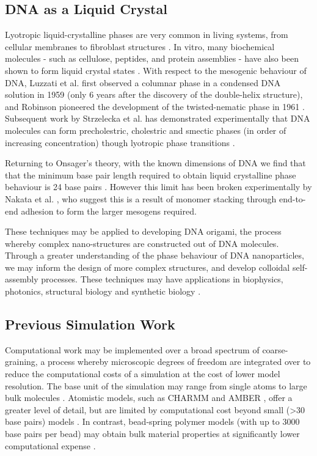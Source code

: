 \documentclass[11pt, a4paper]{article} %
\begin{document}
\subsection{DNA as a Liquid Crystal} 
Lyotropic liquid-crystalline phases are very common in living systems, from cellular membranes to fibroblast structures \cite{Stewart1966, Rey2013}. In vitro, many biochemical molecules - such as cellulose, peptides, and protein assemblies - have also been shown to form liquid crystal states \cite{Zhao2019}. With respect to the mesogenic behaviour of DNA, Luzzati et al. first observed a columnar phase in a condensed DNA solution in 1959 (only 6 years after the discovery of the double-helix structure), and Robinson pioneered the development of the twisted-nematic phase in 1961 \cite{Luzzati1959, Robinson1961}. Subsequent work by Strzelecka et al. has demonstrated experimentally that DNA molecules can form precholestric, cholestric and smectic phases (in order of increasing concentration) though lyotropic phase transitions \cite{Strzelecka1988}. 

Returning to Onsager's theory, with the known dimensions of DNA we find that that the minimum base pair length required to obtain liquid crystalline phase behaviour is 24 base pairs \cite{Bolhuis1997}. However this limit has been broken experimentally by Nakata et al. \cite{Nakata2007, Zanchetta2008}, who suggest this is a result of monomer stacking through end-to-end adhesion to form the larger mesogens required.

These techniques may be applied to developing DNA origami, the process whereby complex nano-structures are constructed out of DNA molecules. Through a greater understanding of the phase behaviour of DNA nanoparticles, we may inform the design of more complex structures, and develop colloidal self-assembly processes. These techniques may have applications in biophysics, photonics, structural biology and synthetic biology \cite{Nummelin2018, Praetorius2017, Bathe2017}.


\subsection{Previous Simulation Work} \label{sec:PrevWork}
Computational work may be implemented over a broad spectrum of coarse-graining, a process whereby microscopic degrees of freedom are integrated over to reduce the computational costs of a simulation at the cost of lower model resolution. The base unit of the simulation may range from single atoms to large bulk molecules \cite{Inglfsson2013, Potoyan2012}. Atomistic models, such as CHARMM \cite{MacKerell1995} and AMBER \cite{SalomonFerrer2012}, offer a greater level of detail, but are limited by computational cost beyond small (>30 base pairs) models \cite{Cheatham2004}. In contrast, bead-spring polymer models (with up to 3000 base pairs per bead) may obtain bulk material properties at significantly lower computational expense \cite{Michieletto2016}.
\end{document}
